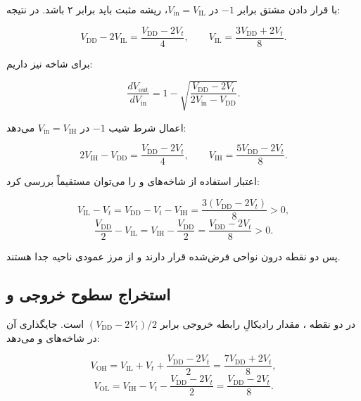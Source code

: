 با قرار دادن مشتق برابر \(-1\) در \(V_{\mathrm{in}}=V_{\mathrm{IL}}\)، ریشه مثبت باید برابر ۲ باشد. در نتیجه:

\nopagebreak[3]
\begin{equation}\label{eq:ex17-4}
V_{\mathrm{DD}}-2V_{\mathrm{IL}}
=\frac{V_{\mathrm{DD}}-2V_t}{4},
\qquad
\boxed{V_{\mathrm{IL}}=\frac{3V_{\mathrm{DD}}+2V_t}{8}}.
\end{equation}

برای شاخه  نیز داریم:

\nopagebreak[3]
\begin{equation}\label{eq:ex17-5}
\frac{dV_{\mathrm{out}}}{dV_{\mathrm{in}}}
=1-\sqrt{\frac{V_{\mathrm{DD}}-2V_t}{2V_{\mathrm{in}}-V_{\mathrm{DD}}}}.
\end{equation}

اعمال شرط شیب \(-1\) در \(V_{\mathrm{in}}=V_{\mathrm{IH}}\) می‌دهد:

\nopagebreak[3]
\begin{equation}\label{eq:ex17-6}
2V_{\mathrm{IH}}-V_{\mathrm{DD}}
=\frac{V_{\mathrm{DD}}-2V_t}{4},
\qquad
\boxed{V_{\mathrm{IH}}=\frac{5V_{\mathrm{DD}}-2V_t}{8}}.
\end{equation}

اعتبار استفاده از شاخه‌های  و  را می‌توان مستقیماً بررسی کرد:

\nopagebreak[3]
\begin{equation}\label{eq:ex17-7}
V_{\mathrm{IL}}-V_t
=V_{\mathrm{DD}}-V_t-V_{\mathrm{IH}}
=\frac{3(V_{\mathrm{DD}}-2V_t)}{8}>0,
\end{equation}
\nopagebreak[3]
\begin{equation}\label{eq:ex17-8}
\frac{V_{\mathrm{DD}}}{2}-V_{\mathrm{IL}}
=V_{\mathrm{IH}}-\frac{V_{\mathrm{DD}}}{2}
=\frac{V_{\mathrm{DD}}-2V_t}{8}>0.
\end{equation}

پس دو نقطه درون نواحی فرض‌شده قرار دارند و از مرز عمودی ناحیه  جدا هستند.

\subsection*{استخراج سطوح خروجی و }

در دو نقطه ، مقدار رادیکالِ رابطه خروجی برابر \((V_{\mathrm{DD}}-2V_t)/2\) است. جایگذاری آن در شاخه‌های  و  می‌دهد:

\nopagebreak[3]
\begin{equation}\label{eq:ex17-9}
V_{\mathrm{OH}}
=V_{\mathrm{IL}}+V_t+\frac{V_{\mathrm{DD}}-2V_t}{2}
=\frac{7V_{\mathrm{DD}}+2V_t}{8},
\end{equation}
\nopagebreak[3]
\begin{equation}\label{eq:ex17-10}
V_{\mathrm{OL}}
=V_{\mathrm{IH}}-V_t-\frac{V_{\mathrm{DD}}-2V_t}{2}
=\frac{V_{\mathrm{DD}}-2V_t}{8}.
\end{equation}

